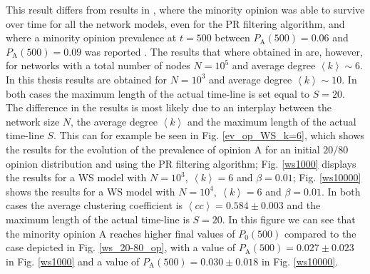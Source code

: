 \documentclass[11 pt , letterpaper , twoside , openright]{book}
\begin{document}
This result differs from results in \cite{Perra2019}, where the minority opinion was able to survive over time for all the network models, even for the PR filtering algorithm, and where a minority opinion prevalence at $t=500$ between $P_\text{A}(500) = 0.06$ and $P_\text{A}(500) = 0.09$ was reported \cite{Perra2019}. The results that where obtained in \cite{Perra2019} are, however, for networks with a total number of nodes $N = 10^5$ and average degree $\left<k\right> \sim 6$. In this thesis results are obtained for $N=10^3$ and average degree $\left<k\right> \sim 10$. In both cases the maximum length of the actual time-line is set equal to $S=20$. The difference in the results is most likely due to an interplay between the network size $N$, the average degree $\left<k\right>$ and the maximum length of the actual time-line $S$. This can for example be seen in Fig. \ref{ev_op_WS_k=6}, which shows the results for the evolution of the prevalence of opinion A for an initial $20/80$ opinion distribution and using the PR filtering algorithm; Fig. \ref{ws1000} displays the results for a WS model with $N=10^3,\ \left<k\right>=6$ and $\beta=0.01$; Fig. \ref{ws10000} shows the results for a WS model with $N=10^4,\ \left<k\right>=6$ and $\beta=0.01$. In both cases the average clustering coefficient is $\left<cc\right> = 0.584 \pm 0.003$ and the maximum length of the actual time-line is $S=20$. In this figure we can see that the minority opinion A reaches higher final values of $P_0(500)$ compared to the case depicted in Fig. \ref{ws_20-80_op}, with a value of $P_\text{A}(500) = 0.027 \pm 0.023$ in Fig. \ref{ws1000} and a value of $P_\text{A}(500) = 0.030 \pm 0.018$ in Fig. \ref{ws10000}.
\end{document}

